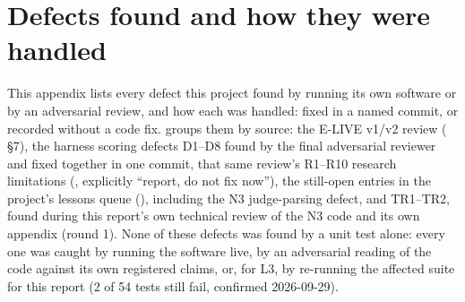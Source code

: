 \section{Defects found and how they were handled}
\label{app:defects}

This appendix lists every defect this project found by running its own software or by an
adversarial review, and how each was handled: fixed in a named commit, or recorded without a code
fix.  groups them by source: the E-LIVE v1/v2 review
( \S7), the harness scoring defects D1--D8 found by the final
adversarial reviewer and fixed together in one commit, that same review's R1--R10 research
limitations (, explicitly \enquote{report, do not
fix now}), the still-open entries in the project's lessons queue
(), including the N3 judge-parsing defect, and TR1--TR2, found during this
report's own technical review of the N3 code and its own appendix (round 1). None of these defects
was found by
a unit test alone: every one was caught by running the software live, by an adversarial reading of
the code against its own registered claims, or, for L3, by re-running the affected suite for this
report (2 of 54  tests still fail, confirmed 2026-09-29).

